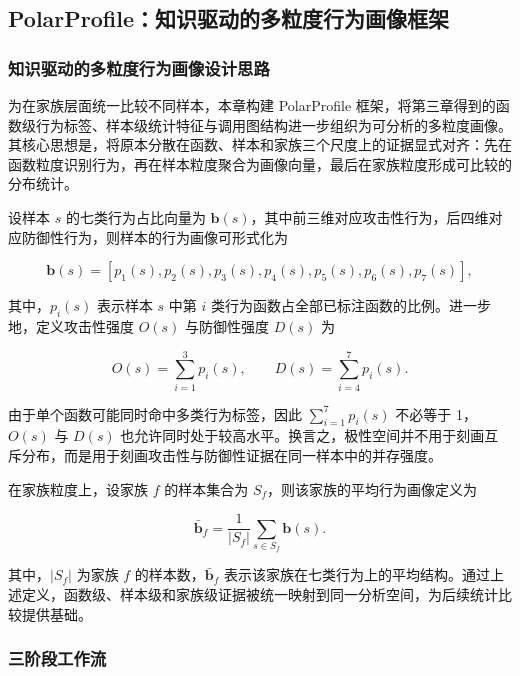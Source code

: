 \subsection{PolarProfile：知识驱动的多粒度行为画像框架}

\subsubsection{知识驱动的多粒度行为画像设计思路}

为在家族层面统一比较不同样本，本章构建 PolarProfile 框架，将第三章得到的函数级行为标签、样本级统计特征与调用图结构进一步组织为可分析的多粒度画像。其核心思想是，将原本分散在函数、样本和家族三个尺度上的证据显式对齐：先在函数粒度识别行为，再在样本粒度聚合为画像向量，最后在家族粒度形成可比较的分布统计。

设样本 $s$ 的七类行为占比向量为 $\mathbf{b}(s)$，其中前三维对应攻击性行为，后四维对应防御性行为，则样本的行为画像可形式化为

\begin{equation}
\mathbf{b}(s)=\left[p_{1}(s),p_{2}(s),p_{3}(s),p_{4}(s),p_{5}(s),p_{6}(s),p_{7}(s)\right],
\end{equation}

其中，$p_i(s)$ 表示样本 $s$ 中第 $i$ 类行为函数占全部已标注函数的比例。进一步地，定义攻击性强度 $O(s)$ 与防御性强度 $D(s)$ 为

\begin{equation}
O(s)=\sum_{i=1}^{3}p_i(s), \qquad D(s)=\sum_{i=4}^{7}p_i(s).
\end{equation}

由于单个函数可能同时命中多类行为标签，因此 $\sum_{i=1}^{7}p_i(s)$ 不必等于 1，$O(s)$ 与 $D(s)$ 也允许同时处于较高水平。换言之，极性空间并不用于刻画互斥分布，而是用于刻画攻击性与防御性证据在同一样本中的并存强度。

在家族粒度上，设家族 $f$ 的样本集合为 $S_f$，则该家族的平均行为画像定义为

\begin{equation}
\bar{\mathbf{b}}_f=\frac{1}{|S_f|}\sum_{s\in S_f}\mathbf{b}(s).
\end{equation}

其中，$|S_f|$ 为家族 $f$ 的样本数，$\bar{\mathbf{b}}_f$ 表示该家族在七类行为上的平均结构。通过上述定义，函数级、样本级和家族级证据被统一映射到同一分析空间，为后续统计比较提供基础。

\subsubsection{三阶段工作流}

